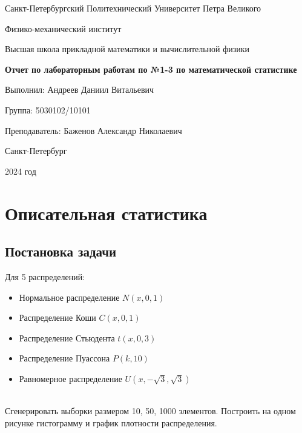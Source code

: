 \documentclass[14pt]{extarticle}
\begin{document}
\pagestyle{empty}
\begin{center}
    Санкт-Петербургский Политехнический Университет Петра Великого

    \vspace{0.3cm}

    Физико-механический институт

    \vspace{0.3cm}

    Высшая школа прикладной математики и вычислительной физики

    \vspace{3cm}

    {\large\textbf{Отчет по лабораторным работам по №1-3 по математической статистике}}

    \vspace{4.5cm}

    Выполнил: \hspace{5.5cm}Андреев Даниил Витальевич

    Группа: \hspace{9.5cm}5030102/10101

    Преподаватель: \hspace{3.6cm}Баженов Александр Николаевич

    \vspace{4cm}

    Санкт-Петербург

    2024 год
\end{center}

\newpage

\section{Описательная статистика}
\subsection{Постановка задачи}
Для 5 распределений:

\begin{itemize}
    \item Нормальное распределение \(N(x, 0, 1)\)
    \item Распределение Коши \(C(x, 0, 1)\)
    \item Распределение Стьюдента \(t(x, 0, 3)\)
    \item Распределение Пуассона \(P(k, 10)\)
    \item Равномерное распределение \(U(x,-\sqrt{3}, \sqrt{3})\)
\end{itemize}\\
Сгенерировать выборки размером 10, 50, 1000 элементов. Построить на одном рисунке гистограмму и график плотности распределения.
\end{document}
